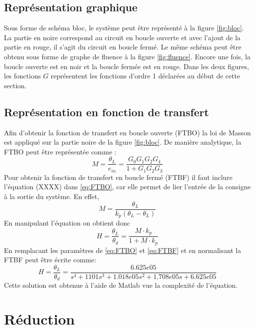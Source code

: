 \documentclass{udes_rapport} %
\begin{document}
\subsection{Représentation graphique}
Sous forme de schéma bloc, le système peut être représenté à la figure \ref{fig:bloc}.
La partie en noire correspond au circuit en boucle ouverte et avec l'ajout de la partie en rouge, il s'agit du circuit en boucle fermé. Le même schéma peut être obtenu sous forme de graphe de fluence à la figure \ref{fig:fluence}.
Encore une fois, la boucle ouverte est en noir et la boucle fermée est en rouge. Dans les deux figures, les fonctions $G$ représentent les fonctions d'ordre 1 déclarées au début de cette section.
\subsection{Représentation en fonction de transfert}
Afin d'obtenir la fonction de transfert en boucle ouverte (FTBO) la loi de Masson est appliqué sur la partie noire de la figure \ref{fig:bloc}. De manière analytique, la FTBO peut être représentée comme :
\begin{equation}
M = \frac{\theta_L}{e_{in}} = \frac{G_0 G_1 G_2 G_4}{1 + G_1 G_2 G_3}
\label{eq:FTBO}
\end{equation}
Pour obtenir la fonction de transfert en boucle fermé (FTBF) il faut inclure l'équation (XXXX) dans \eqref{eq:FTBO}, car elle permet de lier l'entrée de la consigne à la sortie du système. En effet,
\[	M = \frac{\theta_L}{k_p (\theta_L -\theta_L )}	\]
En manipulant l'équation on obtient donc
\begin{equation}
H = \frac{\theta_L}{\theta_d} = \frac{M \cdot k_p}{1+M \cdot k_p}
\label{eq:FTBF}
\end{equation}
En remplacant les paramètres de \eqref{eq:FTBO} et \eqref{eq:FTBF} et en normalisant la FTBF peut être écrite comme:
\begin{equation}
H = \frac{\theta_L}{\theta_d} = \frac{6.625e05}{s^4 + 1101s^3 + 1.018e05s^2 + 1.708e05s + 6.625e05}
\label{eq:nmum_FTBF}
\end{equation}
Cette solution est obtenue à l'aide de Matlab vue la complexité de l'équation.
\section{Réduction}
\end{document}
